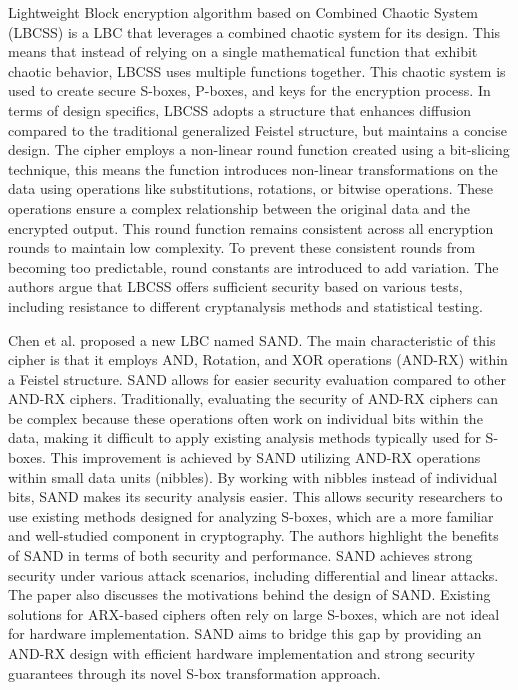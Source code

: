 \documentclass[conference]{IEEEtran}
\begin{document}
Lightweight Block encryption algorithm based on Combined Chaotic System (LBCSS) is a LBC that leverages a combined chaotic system for its design. This means that instead of relying on a single mathematical function that exhibit chaotic behavior, LBCSS uses multiple functions together. This chaotic system is used to create secure S-boxes, P-boxes, and keys for the encryption process. In terms of design specifics, LBCSS adopts a structure that enhances diffusion compared to the traditional generalized Feistel structure, but maintains a concise design. The cipher employs a non-linear round function created using a bit-slicing technique, this means the function introduces non-linear transformations on the data using operations like substitutions, rotations, or bitwise operations. These operations ensure a complex relationship between the original data and the encrypted output. This round function remains consistent across all encryption rounds to maintain low complexity. To prevent these consistent rounds from becoming too predictable, round constants are introduced to add variation. The authors argue that LBCSS offers sufficient security based on various tests, including resistance to different cryptanalysis methods and statistical testing\cite{LBCCS}.


Chen et al. proposed a new LBC named SAND. The main characteristic of this cipher is that it employs AND, Rotation, and XOR operations (AND-RX) within a Feistel structure. SAND allows for easier security evaluation compared to other AND-RX ciphers. Traditionally, evaluating the security of AND-RX ciphers can be complex because these operations often work on individual bits within the data, making it difficult to apply existing analysis methods typically used for S-boxes. This improvement is achieved by SAND utilizing AND-RX operations within small data units (nibbles). By working with nibbles instead of individual bits, SAND makes its security analysis easier. This allows security researchers to use existing methods designed for analyzing S-boxes, which are a more familiar and well-studied component in cryptography. The authors highlight the benefits of SAND in terms of both security and performance. SAND achieves strong security under various attack scenarios, including differential and linear attacks. The paper also discusses the motivations behind the design of SAND. Existing solutions for ARX-based ciphers often rely on large S-boxes, which are not ideal for hardware implementation. SAND aims to bridge this gap by providing an AND-RX design with efficient hardware implementation and strong security guarantees through its novel S-box transformation approach\cite{SAND}.
\end{document}
